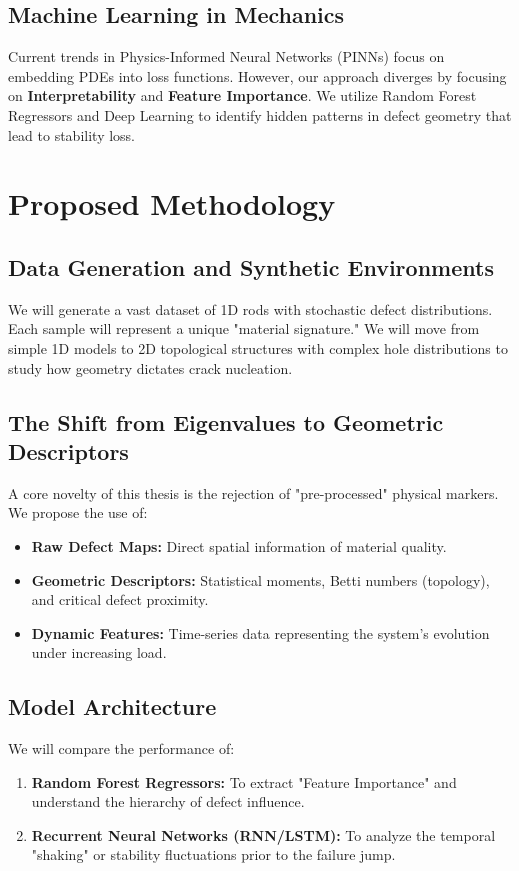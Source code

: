 \documentclass[12pt]{article}
\begin{document}
\subsection{Machine Learning in Mechanics}
Current trends in Physics-Informed Neural Networks (PINNs) focus on embedding PDEs into loss functions. However, our approach diverges by focusing on \textbf{Interpretability} and \textbf{Feature Importance}. We utilize Random Forest Regressors and Deep Learning to identify hidden patterns in defect geometry that lead to stability loss.

\section{Proposed Methodology}
\subsection{Data Generation and Synthetic Environments}
We will generate a vast dataset of 1D rods with stochastic defect distributions. Each sample will represent a unique "material signature." We will move from simple 1D models to 2D topological structures with complex hole distributions to study how geometry dictates crack nucleation.

\subsection{The Shift from Eigenvalues to Geometric Descriptors}
A core novelty of this thesis is the rejection of "pre-processed" physical markers. We propose the use of:
\begin{itemize}
    \item \textbf{Raw Defect Maps:} Direct spatial information of material quality.
    \item \textbf{Geometric Descriptors:} Statistical moments, Betti numbers (topology), and critical defect proximity.
    \item \textbf{Dynamic Features:} Time-series data representing the system's evolution under increasing load.
\end{itemize}

\subsection{Model Architecture}
We will compare the performance of:
\begin{enumerate}
    \item \textbf{Random Forest Regressors:} To extract "Feature Importance" and understand the hierarchy of defect influence.
    \item \textbf{Recurrent Neural Networks (RNN/LSTM):} To analyze the temporal "shaking" or stability fluctuations prior to the failure jump.
\end{enumerate}
\end{document}
